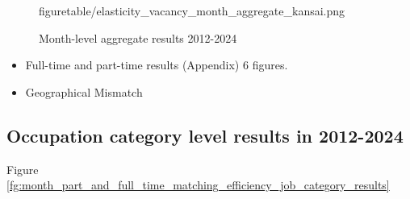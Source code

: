 \documentclass[12pt]{article}
\begin{document}
\begin{figure}[!ht]
\begin{center}
{  {figuretable/elasticity_vacancy_month_aggregate_kansai.png}}
  \\
  \caption{Month-level aggregate results 2012-2024}
  \label{fg:month_part_and_full_time_elasticity_vacancy_month_aggregate_prefecture_results} 
  \end{center}
  \footnotesize
\end{figure} 

\begin{itemize}
    \item Full-time and part-time results (Appendix) 6 figures.
    \item Geographical Mismatch
\end{itemize}

\subsection{Occupation category level results in 2012-2024}

Figure \ref{fg:month_part_and_full_time_matching_efficiency_job_category_results}
\end{document}
